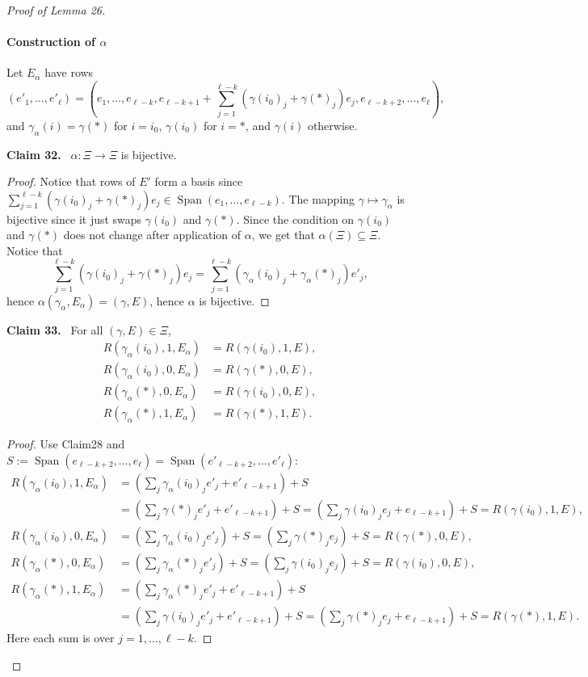 \documentclass[10pt,a4paper]{article}
\newenvironment{authorclaim}[1]{\par\medskip\noindent\textbf{#1.}\ \ignorespaces}{\par\medskip}
\begin{document}
\begin{proof}[Proof of Lemma 26]
\paragraph{Construction of $\alpha$}
Let $E_\alpha$ have rows
\[
(e'_1,\ldots,e'_\ell)=
(e_1,\ldots,e_{\ell-k},e_{\ell-k+1}+\sum_{j=1}^{\ell-k}(\gamma(i_0)_j+\gamma(*)_j)e_j,e_{\ell-k+2},\ldots,e_\ell),
\]
and $\gamma_\alpha(i)=\gamma(*)$ for $i=i_0$, $\gamma(i_0)$ for $i=*$, and $\gamma(i)$ otherwise.
\begin{authorclaim}{Claim 32}
$\alpha:\Xi\to\Xi$ is bijective.
\end{authorclaim}
\begin{proof}
Notice that rows of $E'$ form a basis since $\sum_{j=1}^{\ell-k}(\gamma(i_0)_j+\gamma(*)_j)e_j\in\operatorname{Span}(e_1,\ldots,e_{\ell-k})$. The mapping $\gamma\mapsto\gamma_\alpha$ is bijective since it just swaps $\gamma(i_0)$ and $\gamma(*)$. Since the condition on $\gamma(i_0)$ and $\gamma(*)$ does not change after application of $\alpha$, we get that $\alpha(\Xi)\subseteq\Xi$. Notice that
\[
\sum_{j=1}^{\ell-k}(\gamma(i_0)_j+\gamma(*)_j)e_j
=\sum_{j=1}^{\ell-k}(\gamma_\alpha(i_0)_j+\gamma_\alpha(*)_j)e'_j,
\]
hence $\alpha(\gamma_\alpha,E_\alpha)=(\gamma,E)$, hence $\alpha$ is bijective.
\end{proof}
\begin{authorclaim}{Claim 33}
For all $(\gamma,E)\in\Xi$,
\begin{align*}
R(\gamma_\alpha(i_0),1,E_\alpha)&=R(\gamma(i_0),1,E),\\
R(\gamma_\alpha(i_0),0,E_\alpha)&=R(\gamma(*),0,E),\\
R(\gamma_\alpha(*),0,E_\alpha)&=R(\gamma(i_0),0,E),\\
R(\gamma_\alpha(*),1,E_\alpha)&=R(\gamma(*),1,E).
\end{align*}
\end{authorclaim}
\begin{proof}
Use Claim28 and $S:=\operatorname{Span}(e_{\ell-k+2},\ldots,e_\ell)=\operatorname{Span}(e'_{\ell-k+2},\ldots,e'_\ell)$:
\begin{align*}
R(\gamma_\alpha(i_0),1,E_\alpha)
&=(\sum_j\gamma_\alpha(i_0)_je'_j+e'_{\ell-k+1})+S\\
&=(\sum_j\gamma(*)_je'_j+e'_{\ell-k+1})+S
=(\sum_j\gamma(i_0)_je_j+e_{\ell-k+1})+S
=R(\gamma(i_0),1,E),\\
R(\gamma_\alpha(i_0),0,E_\alpha)
&=(\sum_j\gamma_\alpha(i_0)_je'_j)+S=(\sum_j\gamma(*)_je_j)+S=R(\gamma(*),0,E),\\
R(\gamma_\alpha(*),0,E_\alpha)
&=(\sum_j\gamma_\alpha(*)_je'_j)+S=(\sum_j\gamma(i_0)_je_j)+S=R(\gamma(i_0),0,E),\\
R(\gamma_\alpha(*),1,E_\alpha)
&=(\sum_j\gamma_\alpha(*)_je'_j+e'_{\ell-k+1})+S\\
&=(\sum_j\gamma(i_0)_je'_j+e'_{\ell-k+1})+S
=(\sum_j\gamma(*)_je_j+e_{\ell-k+1})+S=R(\gamma(*),1,E).
\end{align*}
Here each sum is over $j=1,\ldots,\ell-k$.
\end{proof}

\end{proof}
\end{document}
